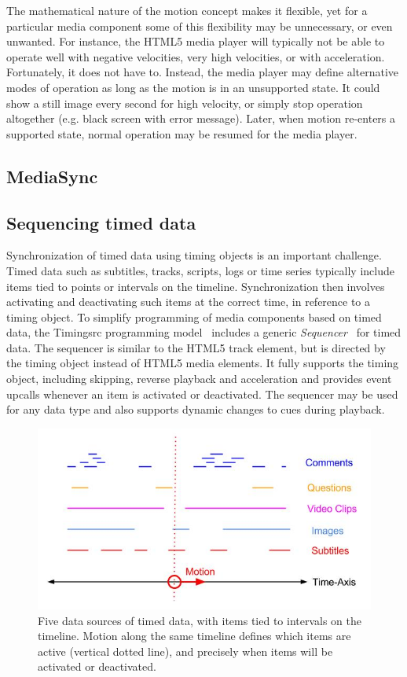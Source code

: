 The mathematical nature of the motion concept makes it flexible, yet for a
particular media component some of this flexibility may be unnecessary, or
even unwanted. For instance, the HTML5 media player will typically not be able
to operate well with negative velocities, very high velocities, or with
acceleration. Fortunately, it does not have to. Instead, the media player may
define alternative modes of operation as long as the motion is in an
unsupported state. It could show a still image every second for high velocity,
or simply stop operation altogether (e.g. black screen with error message).
Later, when motion re-enters a supported state, normal operation may be
resumed for the media player.


\subsection{MediaSync}



\subsection{Sequencing timed data}


Synchronization of timed data using timing objects is an important challenge.
Timed data such as subtitles, tracks, scripts, logs or time series typically
include items tied to points or intervals on the timeline. Synchronization
then involves activating and deactivating such items at the correct time, in
reference to a timing object. To simplify programming of media components
based on timed data, the Timingsrc programming model~\cite{timingsrc} includes
a generic \emph{Sequencer}~\cite{sequencer} for timed data. The sequencer is
similar to the HTML5 track element, but is directed by the timing object
instead of HTML5 media elements. It fully supports the timing object,
including skipping, reverse playback and acceleration and provides event
upcalls whenever an item is activated or deactivated. The sequencer may be
used for any data type and also supports dynamic changes to cues during
playback.

\begin{figure}[h]
\centering
\includegraphics[scale=.4]{fig/sequencer.jpg}
\caption{Five data sources of timed data, with items tied to intervals on the timeline. Motion along the same timeline defines which items are active (vertical dotted line), and precisely when items will be activated or deactivated.}
\label{fig:sequencer}
\end{figure}

